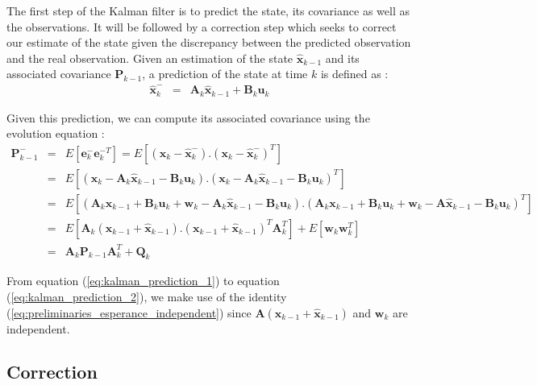 \documentclass[10pt,oneside]{scrartcl}
\newcommand\vecteur[1]{\boldsymbol#1}
\newcommand\matrice[1]{\mathbf#1}
\begin{document}
The first step of the Kalman filter is to predict the state, its covariance as well as the observations. It will be followed by a correction step which seeks to correct our estimate of the state given the discrepancy between the predicted observation and the real observation. Given an estimation of the state $\hat{\vecteur{x}}_{k-1}$ and its associated covariance $\matrice{P_{k-1}}$, a prediction of the state at time $k$ is defined as :
\begin{eqnarray}
\hat{\vecteur{x}}^-_k &=& \matrice{A}_k \hat{\vecteur{x}}_{k-1} + \matrice{B}_k \vecteur{u}_k
\end{eqnarray}

Given this prediction, we can compute its associated covariance using
the evolution equation :
\begin{eqnarray}
\matrice{P_{k-1}}^- &=& E[\vecteur{e_k}^- \vecteur{e_k}^{-T}] = E[(\vecteur{x}_k - \hat{\vecteur{x}}_k^-).(\vecteur{x}_k - \hat{\vecteur{x}}_k^-)^T]\\
                  &=& E[(\vecteur{x}_k - \matrice{A}_k
  \hat{\vecteur{x}}_{k-1} - \matrice{B}_k
  \vecteur{u}_k).(\vecteur{x}_k - \matrice{A}_k
  \hat{\vecteur{x}}_{k-1} - \matrice{B}_k \vecteur{u}_k)^T]\\
\label{eq:kalman_prediction_1}                  &=& E[(\matrice{A}_k
  \vecteur{x}_{k-1} + \matrice{B}_k \vecteur{u}_k + \vecteur{w}_{k} -
  \matrice{A}_k \hat{\vecteur{x}}_{k-1} - \matrice{B}_k \vecteur{u}_k).(\matrice{A}_k\vecteur{x}_{k-1} +
  \matrice{B}_k \vecteur{u}_k + \vecteur{w}_k - \matrice{A} \hat{\vecteur{x}}_{k-1}- \matrice{B}_k \vecteur{u}_k)^T]\\
\label{eq:kalman_prediction_2}                  &=& E[\matrice{A}_k (\vecteur{x}_{k-1} + \hat{\vecteur{x}}_{k-1}).(\vecteur{x}_{k-1} + \hat{\vecteur{x}}_{k-1})^T \matrice{A}_k^T] + E[\vecteur{w}_k \vecteur{w}_k^T] \\
                  &=& \matrice{A}_k \matrice{P}_{k-1} \matrice{A}_k^T + \matrice{Q}_k
\end{eqnarray}

From equation (\ref{eq:kalman_prediction_1}) to equation (\ref{eq:kalman_prediction_2}), we make use of the identity (\ref{eq:preliminaries_esperance_independent}) since $\matrice{A}(\vecteur{x}_{k-1}+\hat{\vecteur{x}}_{k-1})$ and $\vecteur{w}_k$ are independent.

\subsection{Correction}
\end{document}

